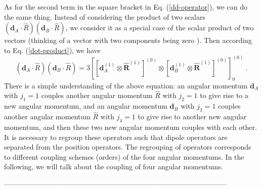 As for the second term in the square bracket in Eq. (\ref{dd-operator}), we can do the same thing. Instead of considering the product of two scalars $(\mathbf{d}_{A}\cdot\hat{R})(\mathbf{d}_{B}\cdot\hat{R})$, we consider it as a special case of the scalar product of two vectors (thinking of a vector with two components being zero ). Then according to Eq. (\ref{dot-product}), we have
\begin{equation}
(\mathbf{d}_{A}\cdot\hat{R})(\mathbf{d}_{B}\cdot\hat{R})= 3\left[ \left[ \mathbf{d}_{A}^{(1)} \otimes \mathbf{\hat{R}}^{(1)} \right]^{(0)}\otimes \left[ \mathbf{d}_{B}^{(1)} \otimes \mathbf{\hat{R}}^{(1)} \right]^{(0)}  \right]_{0}^{(0)}  \ .
\end{equation}
There is a simple understanding of the above equation: an angular momentum $\mathbf{d}_{A}$ with $j_{1}=1$ couples  another angular momentum $\hat{R}$ with $j_{2}=1$ to give rise to a new angular momentum, and an angular momentum $\mathbf{d}_{B}$ with $j_{3}=1$ couples  another angular momentum $\hat{R}$ with $j_{4}=1$ to give rise to another new angular momentum, and then these two new angular momentum couples with each other. It is necessary to regroup these operators such that dipole operators are separated from the position operators. The regrouping of operators corresponds to different coupling schemes (orders) of the four angular momentums. In the following, we will talk about the coupling of four angular momentums.

-----------------------------------------------------------------------------------------------

